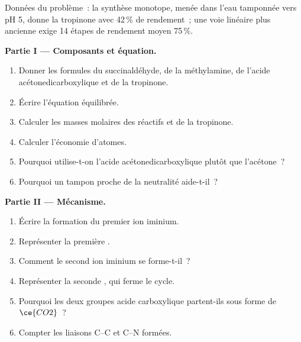 \begin{problem}
\label{pb:b3:total-synthesis:1}
Données du problème~: la synthèse monotope, menée dans l'eau tamponnée vers
pH 5, donne la tropinone avec 42\,\% de rendement~; une voie linéaire plus
ancienne exige 14 étapes de rendement moyen 75\,\%.

\medskip\noindent\textbf{Partie I --- Composants et équation.}
\begin{enumerate}
  \item Donner les formules du succinaldéhyde, de la méthylamine, de
        l'acide acétonedicarboxylique et de la tropinone.
  \item Écrire l'équation équilibrée.
  \item Calculer les masses molaires des réactifs et de la tropinone.
  \item Calculer l'économie d'atomes.
  \item Pourquoi utilise-t-on l'acide acétonedicarboxylique plutôt que
        l'acétone~?
  \item Pourquoi un tampon proche de la neutralité aide-t-il~?
\end{enumerate}

\medskip\noindent\textbf{Partie II --- Mécanisme.}
\begin{enumerate}[resume]
  \item Écrire la formation du premier ion iminium.
  \item Représenter la première .
  \item Comment le second ion iminium se forme-t-il~?
  \item Représenter la seconde , qui ferme le cycle.
  \item Pourquoi les deux groupes acide carboxylique partent-ils sous forme de $\ce{CO2}$~?
  \item Compter les liaisons C--C et C--N formées.
\end{enumerate}


\end{problem}
